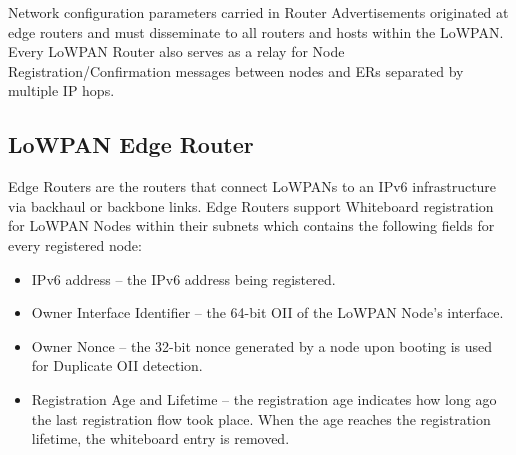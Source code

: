 \documentclass[a4paper,11pt,oneside]{article}
\begin{document}
Network configuration parameters carried in Router Advertisements originated at edge routers and must disseminate to all routers and hosts within the LoWPAN. Every LoWPAN Router also serves as a relay for Node Registration/Confirmation messages between nodes and ERs separated by multiple IP hops.

\subsection{LoWPAN Edge Router}
Edge Routers are the routers that connect LoWPANs to an IPv6 infrastructure via backhaul or backbone links. Edge Routers support Whiteboard registration for LoWPAN Nodes within their subnets which contains the following fields for every registered node:
\begin{itemize}
\item IPv6 address --  the IPv6 address being registered.
\item Owner Interface Identifier -- the 64-bit OII of the LoWPAN Node's interface.
\item Owner Nonce -- the 32-bit nonce generated by a node upon booting is used for Duplicate OII detection.
\item Registration Age and Lifetime -- the registration age indicates how long ago the last registration flow took place.  When the age reaches the registration lifetime, the whiteboard entry is removed.
\end{itemize}



\nocite{rfc4443} 
\nocite{rfc4861} 
\nocite{draft-nd-06} 
 
 
 
\end{document}
